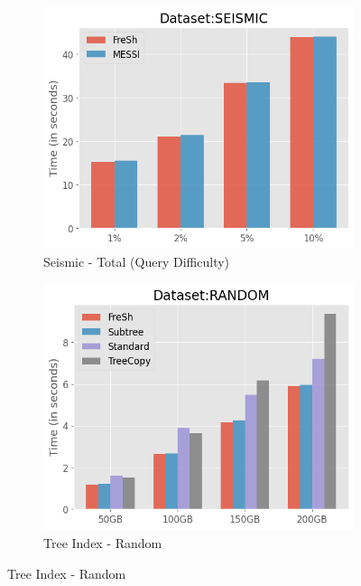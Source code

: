 
\begin{figure}[htbp]
    \centering
    \begin{subfigure}{0.48\textwidth}
        \includegraphics[width=\textwidth]{figures/Experiments/scale-query-difficulty-seismic-total.png}
        \caption{Seismic - Total (Query Difficulty)}
        \label{fig:eval:scale-query-difficulty:seismic:total}
    \end{subfigure}    
    \begin{subfigure}{0.48\textwidth}
        \includegraphics[width=\textwidth]{figures/Experiments/scale-dataset-tree-index-random.png}
        \caption{Tree Index - Random}
        \label{fig:eval:scale-dataset:tree-index:random}
    \end{subfigure}    


\end{figure}
